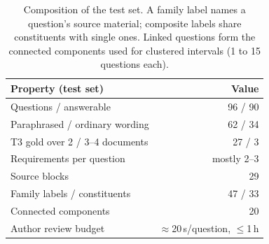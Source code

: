 \begin{table}[t]
\centering
\small
\begin{tabular}{@{}lr@{}}
\toprule
Property (test set) & Value \\
\midrule
Questions / answerable & 96 / 90 \\
Paraphrased / ordinary wording & 62 / 34 \\
T3 gold over 2 / 3--4 documents & 27 / 3 \\
Requirements per question & mostly 2--3 \\
Source blocks & 29 \\
Family labels / constituents & 47 / 33 \\
Connected components & 20 \\
\midrule
Author review budget & ${\approx}$20\,s/question, $\le$1\,h \\
\bottomrule
\end{tabular}
\caption{Composition of the test set. A family label names a question's source material; composite labels share constituents with single ones. Linked questions form the connected components used for clustered intervals (1 to 15 questions each).}
\label{tab:composition}
\end{table}
